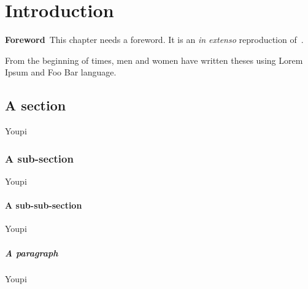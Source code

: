 \chapter{Introduction}
\label{chap:intro}
\minitoc

\begin{center}
\begin{minipage}[b]{0.9\linewidth}
\small
\textbf{Foreword\,}
This chapter needs a foreword. It is an \emph{in extenso} reproduction of~\cite{Ourselin:MICCAI:00}.
\end{minipage}
\end{center}


From the beginning of times, men and women have written theses using Lorem Ipsum and Foo Bar language.

\section{A section}
%
Youpi

\subsection{A sub-section}
%
Youpi

\subsubsection{A sub-sub-section}
%
Youpi

\paragraph{A paragraph}
%
Youpi